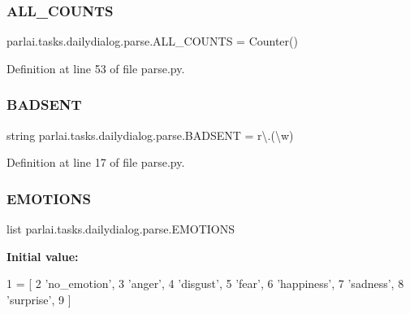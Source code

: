 \subsubsection{\texorpdfstring{A\+L\+L\+\_\+\+C\+O\+U\+N\+TS}{ALL\_COUNTS}}
{\footnotesize\ttfamily parlai.\+tasks.\+dailydialog.\+parse.\+A\+L\+L\+\_\+\+C\+O\+U\+N\+TS = Counter()}



Definition at line 53 of file parse.\+py.

\mbox{\label{namespaceparlai_1_1tasks_1_1dailydialog_1_1parse_ab81027afb6e00df2a610bb3d3c77e11b}} 
\subsubsection{\texorpdfstring{B\+A\+D\+S\+E\+NT}{BADSENT}}
{\footnotesize\ttfamily string parlai.\+tasks.\+dailydialog.\+parse.\+B\+A\+D\+S\+E\+NT = r\textquotesingle{}\textbackslash{}.(\textbackslash{}w)\textquotesingle{}}



Definition at line 17 of file parse.\+py.

\mbox{\label{namespaceparlai_1_1tasks_1_1dailydialog_1_1parse_a4dcf4c3798e88e5b49c655dee367234d}} 
\subsubsection{\texorpdfstring{E\+M\+O\+T\+I\+O\+NS}{EMOTIONS}}
{\footnotesize\ttfamily list parlai.\+tasks.\+dailydialog.\+parse.\+E\+M\+O\+T\+I\+O\+NS}

{\bfseries Initial value\+:}
\begin{DoxyCode}
1 =  [
2     \textcolor{stringliteral}{'no\_emotion'},
3     \textcolor{stringliteral}{'anger'},
4     \textcolor{stringliteral}{'disgust'},
5     \textcolor{stringliteral}{'fear'},
6     \textcolor{stringliteral}{'happiness'},
7     \textcolor{stringliteral}{'sadness'},
8     \textcolor{stringliteral}{'surprise'},
9 ]
\end{DoxyCode}


